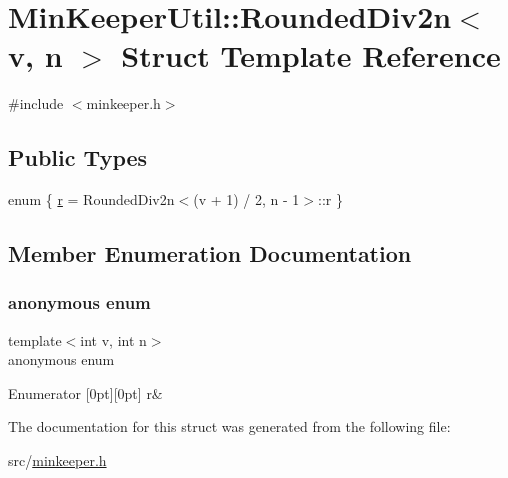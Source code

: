 \hypertarget{structMinKeeperUtil_1_1RoundedDiv2n}{}\section{Min\+Keeper\+Util\+:\+:Rounded\+Div2n$<$ v, n $>$ Struct Template Reference}
\label{structMinKeeperUtil_1_1RoundedDiv2n}


{\ttfamily \#include $<$minkeeper.\+h$>$}

\subsection*{Public Types}
\begin{DoxyCompactItemize}
\item 
enum \{ \hyperlink{structMinKeeperUtil_1_1RoundedDiv2n_af9123e3c7cf99bf56c10f81e4aa84b2bafc2b1c73d3540c5d0d76299c007a98e9}{r} = Rounded\+Div2n$<$(v + 1) / 2, n -\/ 1$>$\+:\+:r
 \}
\end{DoxyCompactItemize}


\subsection{Member Enumeration Documentation}
\mbox{\label{structMinKeeperUtil_1_1RoundedDiv2n_af9123e3c7cf99bf56c10f81e4aa84b2b}} 
\subsubsection{\texorpdfstring{anonymous enum}{anonymous enum}}
{\footnotesize\ttfamily template$<$int v, int n$>$ \\
anonymous enum}

\begin{DoxyEnumFields}{Enumerator}
[0pt][0pt]{}\mbox{\label{structMinKeeperUtil_1_1RoundedDiv2n_af9123e3c7cf99bf56c10f81e4aa84b2bafc2b1c73d3540c5d0d76299c007a98e9}} 
r&\\
\hline

\end{DoxyEnumFields}


The documentation for this struct was generated from the following file\+:\begin{DoxyCompactItemize}
\item 
src/\hyperlink{minkeeper_8h}{minkeeper.\+h}\end{DoxyCompactItemize}

